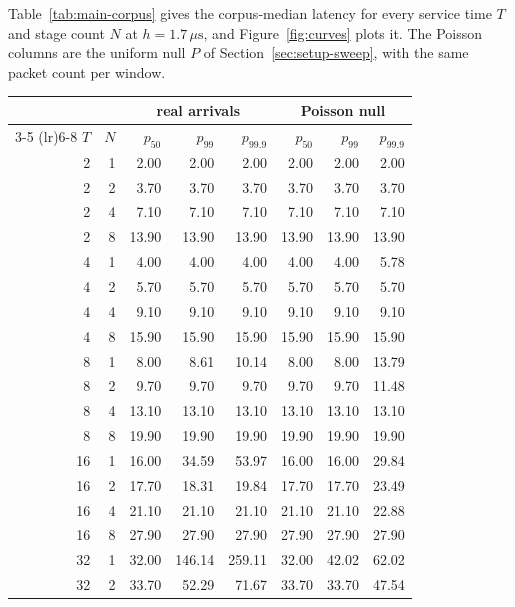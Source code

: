 \documentclass[11pt]{article}
\begin{document}
Table~\ref{tab:main-corpus} gives the corpus-median latency for every service time $T$
and stage count $N$ at $h = 1.7\,\mu\mathrm{s}$, and Figure~\ref{fig:curves} plots it. The
Poisson columns are the uniform null $P$ of Section~\ref{sec:setup-sweep}, with the same
packet count per window.

\begin{table}[tbp]
\centering
\small
\begin{tabular}{@{}rr rrr rrr@{}}
\toprule
 & & \multicolumn{3}{c}{real arrivals} & \multicolumn{3}{c}{Poisson null} \\
\cmidrule(lr){3-5} \cmidrule(lr){6-8}
$T$ & $N$ & $p_{50}$ & $p_{99}$ & $p_{99.9}$ & $p_{50}$ & $p_{99}$ & $p_{99.9}$ \\
\midrule
 2 & 1 &   2.00 &   2.00 &   2.00 &   2.00 &   2.00 &   2.00 \\
 2 & 2 &   3.70 &   3.70 &   3.70 &   3.70 &   3.70 &   3.70 \\
 2 & 4 &   7.10 &   7.10 &   7.10 &   7.10 &   7.10 &   7.10 \\
 2 & 8 &  13.90 &  13.90 &  13.90 &  13.90 &  13.90 &  13.90 \\
\midrule
 4 & 1 &   4.00 &   4.00 &   4.00 &   4.00 &   4.00 &   5.78 \\
 4 & 2 &   5.70 &   5.70 &   5.70 &   5.70 &   5.70 &   5.70 \\
 4 & 4 &   9.10 &   9.10 &   9.10 &   9.10 &   9.10 &   9.10 \\
 4 & 8 &  15.90 &  15.90 &  15.90 &  15.90 &  15.90 &  15.90 \\
\midrule
 8 & 1 &   8.00 &   8.61 &  10.14 &   8.00 &   8.00 &  13.79 \\
 8 & 2 &   9.70 &   9.70 &   9.70 &   9.70 &   9.70 &  11.48 \\
 8 & 4 &  13.10 &  13.10 &  13.10 &  13.10 &  13.10 &  13.10 \\
 8 & 8 &  19.90 &  19.90 &  19.90 &  19.90 &  19.90 &  19.90 \\
\midrule
16 & 1 &  16.00 &  34.59 &  53.97 &  16.00 &  16.00 &  29.84 \\
16 & 2 &  17.70 &  18.31 &  19.84 &  17.70 &  17.70 &  23.49 \\
16 & 4 &  21.10 &  21.10 &  21.10 &  21.10 &  21.10 &  22.88 \\
16 & 8 &  27.90 &  27.90 &  27.90 &  27.90 &  27.90 &  27.90 \\
\midrule
32 & 1 &  32.00 & 146.14 & 259.11 &  32.00 &  42.02 &  62.02 \\
32 & 2 &  33.70 &  52.29 &  71.67 &  33.70 &  33.70 &  47.54 \\

\end{tabular}
\end{table}
\end{document}

